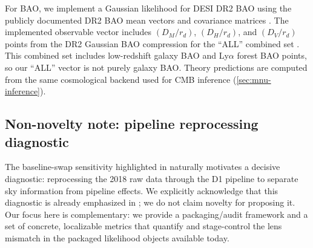 For BAO, we implement a Gaussian likelihood for DESI DR2 BAO using the publicly documented DR2 BAO mean vectors and covariance matrices \cite{desi_dr2_bao_docs,bao_data_v26,desi_dr2_results_ii_bao,desi_dr2_results_i_lya}. The implemented observable vector includes $(D_M/r_d)$, $(D_H/r_d)$, and $(D_V/r_d)$ points from the DR2 Gaussian BAO compression for the ``ALL'' combined set \cite{desi_dr2_bao_docs,bao_data_v26,eisenstein2005_baopeak}. This combined set includes low-redshift galaxy BAO and Ly$\alpha$ forest BAO points, so our ``ALL'' vector is not purely galaxy BAO. Theory predictions are computed from the same cosmological backend used for CMB inference (\cref{sec:mnu-inference}).

\subsection{Non-novelty note: pipeline reprocessing diagnostic}
\label{sec:non-novelty}

The baseline-swap sensitivity highlighted in \cite{arxiv2601_16277} naturally motivates a decisive diagnostic: reprocessing the 2018 raw data through the D1 pipeline to separate sky information from pipeline effects. We explicitly acknowledge that this diagnostic is already emphasized in \cite{arxiv2601_16277}; we do not claim novelty for proposing it. Our focus here is complementary: we provide a packaging/audit framework and a set of concrete, localizable metrics that quantify and stage-control the lens mismatch in the packaged likelihood objects available today.
